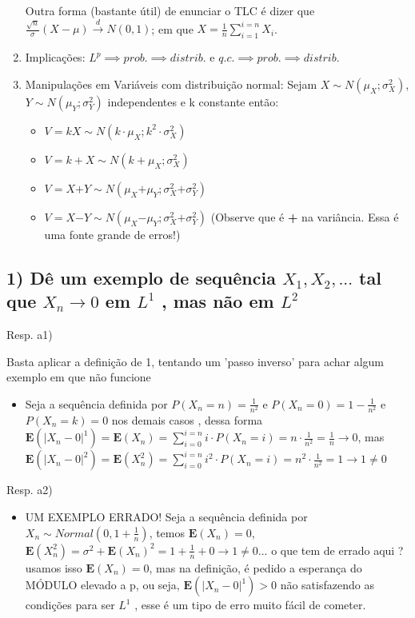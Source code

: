 \documentclass[portuguese]{article}
\begin{document}
\begin{enumerate}
Outra forma (bastante útil) de enunciar o TLC é dizer que $\frac{\sqrt{n}}{\sigma}(X-\mu)\overset{d}{\to}N(0,1)$;
em que $X=\frac{1}{n}\sum_{i=1}^{i=n}X_{i}$.

\item Implicações: $L^{p}\implies prob.\implies distrib.$ e $q.c.\implies prob.\implies distrib.$
\item Manipulações em Variáveis com distribuição normal: Sejam $X\sim N(\mu_{X};\sigma_{X}^{2})$, $Y\sim N(\mu_{Y};\sigma_{Y}^{2})$ independentes e k constante então:

\begin{itemize}
\item $V=kX\sim N(k\cdot\mu_{X};k^{2}\cdot\sigma_{X}^{2})$
\item $V=k+X\sim N(k+\mu_{X};\sigma_{X}^{2})$
\item $V=X\mathbf{+}Y\sim N(\mu_{X}\mathbf{+}\mu_{Y};\sigma_{X}^{2}\mathbf{+}\sigma_{Y}^{2})$
\item $V=X\mathbf{-}Y\sim N(\mu_{X}\mathbf{-}\mu_{Y};\sigma_{X}^{2}\mathbf{+}\sigma_{Y}^{2})$
(Observe que é \textbf{+} na variância. Essa é uma fonte grande de
erros!)
\end{itemize}
\end{enumerate}
\pagebreak{}


\subsection*{\textmd{1) Dê um exemplo de sequência $X_{1},X_{2},...$ tal que
$X_{n}\rightarrow0$ em $L^{1}$ , mas não em $L^{2}$}}

Resp. a1)

Basta aplicar a definição de 1, tentando um 'passo inverso' para achar
algum exemplo em que não funcione
\begin{itemize}
\item Seja a sequência definida por $P(X_{n}=n)=\frac{1}{n^{2}}$ e $P(X_{n}=0)=1-\frac{1}{n^{2}}$
e $P(X_{n}=k)=0$ nos demais casos , dessa forma $\mathbf{E}(\left|X_{n}-0\right|^{1})=\mathbf{E}(X_{n})=\sum_{i=0}^{i=n}i\cdot P(X_{n}=i)=n\cdot\frac{1}{n^{2}}=\frac{1}{n}\rightarrow0$,
mas $\mathbf{E}(\left|X_{n}-0\right|^{2})=\mathbf{E}(X_{n}^{2})=\sum_{i=0}^{i=n}i^{2}\cdot P(X_{n}=i)=n^{2}\cdot\frac{1}{n^{2}}=1\rightarrow1\neq0$
\end{itemize}
Resp. a2)
\begin{itemize}
\item UM EXEMPLO ERRADO! Seja a sequência definida por $X_{n}\sim Normal(0,1+\frac{1}{n})$,
temos $\mathbf{E}(X_{n})=0$, $\mathbf{E}(X_{n}^{2})=\sigma^{2}+\mathbf{E}(X_{n})^{2}=1+\frac{1}{n}+0\rightarrow1\neq0$...
o que tem de errado aqui ? usamos isso $\mathbf{E}(X_{n})=0$, mas
na definição, é pedido a esperança do MÓDULO elevado a p, ou seja,
$\mathbf{E}(\left|X_{n}-0\right|^{1})>0$ não satisfazendo as condições
para ser $L^{1}$ , esse é um tipo de erro muito fácil de cometer.
\end{itemize}
\end{document}
